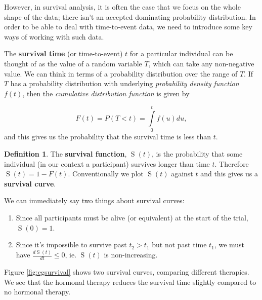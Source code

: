 \documentclass[
  openany]{book}
\providecommand{\tightlist}{%
  \setlength{\itemsep}{0pt}\setlength{\parskip}{0pt}}
\theoremstyle{definition}
\newtheorem{definition}{Definition}[chapter]
\theoremstyle{definition}
\theoremstyle{definition}
\theoremstyle{definition}
\theoremstyle{remark}
\begin{document}
However, in survival analysis, it is often the case that we focus on the whole shape of the data; there isn't an accepted dominating probability distribution. In order to be able to deal with time-to-event data, we need to introduce some key ways of working with such data.

The \textbf{survival time} (or time-to-event) \(t\) for a particular individual can be thought of as the value of a random variable \(T\), which can take any non-negative value. We can think in terms of a probability distribution over the range of \(T\). If \(T\) has a probability distribution with underlying \emph{probability density function} \(f\left(t\right)\), then the \emph{cumulative distribution function} is given by

\[F\left(t\right) = P\left(T<t\right) = \int\limits_0^t f\left(u\right)du, \]
and this gives us the probability that the survival time is less than \(t\).

\begin{definition}
The \textbf{survival function}, \(\operatorname{S}\left(t\right)\), is the probability that some individual (in our context a participant) survives longer than time \(t\). Therefore \(\operatorname{S}\left(t\right) = 1 - F(t)\).
Conventionally we plot \(\operatorname{S}\left(t\right)\) against \(t\) and this gives us a \textbf{survival curve}.
\end{definition}

We can immediately say two things about survival curves:

\begin{enumerate}
\def\labelenumi{\arabic{enumi}.}
\tightlist
\item
  Since all participants must be alive (or equivalent) at the start of the trial, \(\operatorname{S}\left(0\right)=1\).
\item
  Since it's impossible to survive past \(t_2>t_1\) but not past time \(t_1\), we must have \(\frac{d\operatorname{S}\left(t\right)}{dt}\leq{0}\), ie. \(\operatorname{S}\left(t\right)\) is non-increasing.
\end{enumerate}

Figure \ref{fig:egsurvival} shows two survival curves, comparing different therapies. We see that the hormonal therapy reduces the survival time slightly compared to no hormonal therapy.
\end{document}
